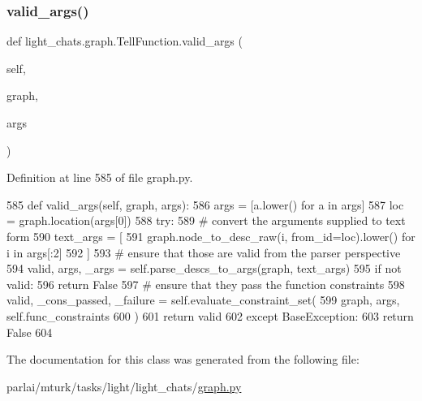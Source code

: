\subsubsection{\texorpdfstring{valid\+\_\+args()}{valid\_args()}}
{\footnotesize\ttfamily def light\+\_\+chats.\+graph.\+Tell\+Function.\+valid\+\_\+args (\begin{DoxyParamCaption}\item[{}]{self,  }\item[{}]{graph,  }\item[{}]{args }\end{DoxyParamCaption})}



Definition at line 585 of file graph.\+py.


\begin{DoxyCode}
585     \textcolor{keyword}{def }valid\_args(self, graph, args):
586         args = [a.lower() \textcolor{keywordflow}{for} a \textcolor{keywordflow}{in} args]
587         loc = graph.location(args[0])
588         \textcolor{keywordflow}{try}:
589             \textcolor{comment}{# convert the arguments supplied to text form}
590             text\_args = [
591                 graph.node\_to\_desc\_raw(i, from\_id=loc).lower() \textcolor{keywordflow}{for} i \textcolor{keywordflow}{in} args[:2]
592             ]
593             \textcolor{comment}{# ensure that those are valid from the parser perspective}
594             valid, args, \_args = self.parse\_descs\_to\_args(graph, text\_args)
595             \textcolor{keywordflow}{if} \textcolor{keywordflow}{not} valid:
596                 \textcolor{keywordflow}{return} \textcolor{keyword}{False}
597             \textcolor{comment}{# ensure that they pass the function constraints}
598             valid, \_cons\_passed, \_failure = self.evaluate\_constraint\_set(
599                 graph, args, self.func\_constraints
600             )
601             \textcolor{keywordflow}{return} valid
602         \textcolor{keywordflow}{except} BaseException:
603             \textcolor{keywordflow}{return} \textcolor{keyword}{False}
604 
\end{DoxyCode}


The documentation for this class was generated from the following file\+:\begin{DoxyCompactItemize}
\item 
parlai/mturk/tasks/light/light\+\_\+chats/\hyperlink{parlai_2mturk_2tasks_2light_2light__chats_2graph_8py}{graph.\+py}\end{DoxyCompactItemize}
